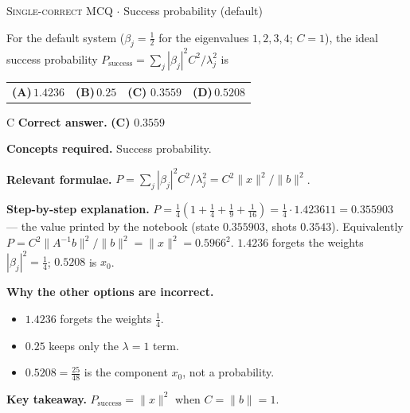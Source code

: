 \documentclass[11pt,a4paper]{article}
\newcommand{\optlabel}[1]{\textbf{(#1)}}
\newcommand{\correctlabel}[1]{\textcolor{okgreen}{\textbf{(#1)}\,\ding{51}}}
\newenvironment{qitem}[1]{\begin{list}{}{\setlength{\leftmargin}{3.3em}\setlength{\labelwidth}{3.1em}%
  \setlength{\labelsep}{0.2em}\setlength{\topsep}{3pt}\setlength{\parsep}{3pt}}\item[\textbf{Q.#1}\hfill]}{\end{list}}
\newcommand{\qsep}{\par\vspace{2pt}{\color{black!15}\hrule}\vspace{4pt}}
\newcommand{\qmeta}[2]{{\footnotesize\color{black!60}\textsc{#1} \;$\cdot$\; #2}\par}
\begin{document}
\begin{qitem}{45}
\qmeta{Single-correct MCQ}{Success probability (default)}
For the default system ($\beta_j = \tfrac12$ for the eigenvalues $1, 2, 3, 4$; $C = 1$), the ideal success probability $P_{\text{success}} = \sum_j|\beta_j|^2C^2/\lambda_j^2$ is
\par\smallskip\noindent\begin{tabularx}{\linewidth}{@{}*{4}{L}@{}}
\optlabel{A}\,$1.4236$ & \optlabel{B}\,$0.25$ & \correctlabel{C}\,$0.3559$ & \optlabel{D}\,$0.5208$
\end{tabularx}
\end{qitem}
\begin{solbox}{C}
\textbf{\color{brand}Correct answer.} \textcolor{okgreen}{\textbf{(C)}} $0.3559$

\textbf{\color{brand}Concepts required.} Success probability.

\textbf{\color{brand}Relevant formulae.} $P = \sum_j|\beta_j|^2C^2/\lambda_j^2 = C^2\|x\|^2/\|b\|^2$.

\textbf{\color{brand}Step-by-step explanation.} $P = \tfrac14\left(1 + \tfrac14 + \tfrac19 + \tfrac1{16}\right) = \tfrac14\cdot1.423611 = 0.355903$ --- the value printed by the notebook (state $0.355903$, shots $0.3543$). Equivalently
$P = C^2\|A^{-1}b\|^2/\|b\|^2 = \|x\|^2 = 0.5966^2$. $1.4236$ forgets the weights $|\beta_j|^2 = \tfrac14$; $0.5208$ is $x_0$.

\textbf{\color{brand}Why the other options are incorrect.}
\begin{itemize}[leftmargin=2.4em, itemsep=1pt, topsep=2pt]
\item[\textbf{(A)}] $1.4236$ forgets the weights $\frac14$.
\item[\textbf{(B)}] $0.25$ keeps only the $\lambda = 1$ term.
\item[\textbf{(D)}] $0.5208 = \frac{25}{48}$ is the component $x_0$, not a probability.
\end{itemize}
\textbf{\color{brand}Key takeaway.} $P_{\text{success}} = \|x\|^2$ when $C = \|b\| = 1$.
\end{solbox}
\qsep
\end{document}
